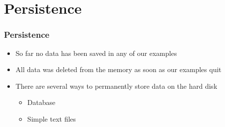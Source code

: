 \documentclass[10pt, a4paper]{beamer} %
\begin{document}
\section{Persistence} %
\label{sec:persistence}

\begin{frame}[c, fragile]\frametitle{Persistence}
	\begin{itemize}
		\item So far no data has been saved in any of our examples
		\item All data was deleted from the memory as soon as our examples quit
		\item There are several ways to permanently store data on the hard disk
		      \begin{itemize}
			      \item Database
			      \item Simple text files
		      \end{itemize}
	\end{itemize}
\end{frame}
\end{document}
